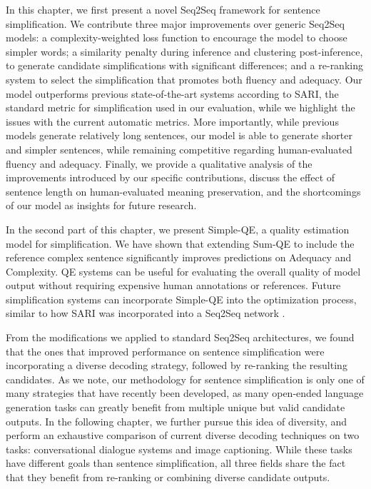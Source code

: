 In this chapter, we first present a novel Seq2Seq framework for sentence simplification. We contribute three major improvements over generic Seq2Seq models: a complexity-weighted loss function to encourage the model to choose simpler words; a similarity penalty during inference and clustering post-inference, to generate candidate simplifications with significant differences; and a re-ranking system to select the simplification that promotes both fluency and adequacy. Our model outperforms previous state-of-the-art systems according to SARI, the standard metric for simplification used in our evaluation, while we highlight the issues with the current automatic metrics. More importantly, while previous models generate relatively long sentences, our model is able to generate shorter and simpler sentences, while remaining competitive regarding human-evaluated fluency and adequacy. Finally, we provide a qualitative analysis of the improvements introduced by our specific contributions, discuss the effect of sentence length on human-evaluated meaning preservation, and the shortcomings of our model as insights for future research.

In the second part of this chapter, we present Simple-QE, a quality estimation model for simplification. We have shown that extending Sum-QE \citep{xenouleas2019sumqe} to include the reference complex sentence significantly improves predictions on Adequacy and Complexity. QE systems can be useful for evaluating the overall quality of model output without requiring expensive human annotations or references. Future simplification systems can incorporate Simple-QE into the optimization process, similar to how SARI was incorporated into a Seq2Seq network \citep{zhang2017sentence}.

From the modifications we applied to standard Seq2Seq architectures, we found that the ones that improved performance on sentence simplification were incorporating a diverse decoding strategy, followed by re-ranking the resulting candidates. As we note, our methodology for sentence simplification is only one of many strategies that have recently been developed, as many open-ended language generation tasks can greatly benefit from multiple unique but valid candidate outputs. In the following chapter, we further pursue this idea of diversity, and perform an exhaustive comparison of current diverse decoding techniques on two tasks: conversational dialogue systems and image captioning. While these tasks have different goals than sentence simplification, all three fields share the fact that they benefit from re-ranking or combining diverse candidate outputs.